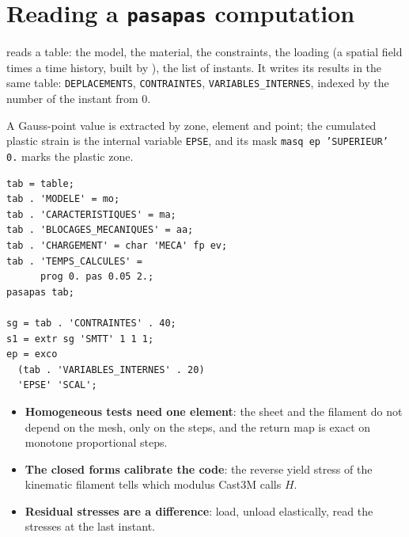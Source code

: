 \section{Reading a \texttt{pasapas} computation}\label{cc:sec4-pasapas}
%
\begin{castemcom}
 reads a table: the model, the material, the constraints, the
loading (a spatial field times a time history, built by ), the list
of instants. It writes its results in the same table: \texttt{DEPLACEMENTS},
\texttt{CONTRAINTES}, \texttt{VARIABLES\_INTERNES}, indexed by the number of
the instant from 0.

A Gauss-point value is extracted by zone, element and point; the cumulated
plastic strain is the internal variable \texttt{EPSE}, and its mask
\texttt{masq ep 'SUPERIEUR' 0.} marks the plastic zone.
\end{castemcom}
\begin{castemlines}
\begin{verbatim}
tab = table;
tab . 'MODELE' = mo;
tab . 'CARACTERISTIQUES' = ma;
tab . 'BLOCAGES_MECANIQUES' = aa;
tab . 'CHARGEMENT' = char 'MECA' fp ev;
tab . 'TEMPS_CALCULES' =
      prog 0. pas 0.05 2.;
pasapas tab;

sg = tab . 'CONTRAINTES' . 40;
s1 = extr sg 'SMTT' 1 1 1;
ep = exco
  (tab . 'VARIABLES_INTERNES' . 20)
  'EPSE' 'SCAL';
\end{verbatim}
\end{castemlines}


\begin{gbox*}
\begin{itemize}
\item \textbf{Homogeneous tests need one element}: the sheet and the
  filament do not depend on the mesh, only on the steps, and the return map is
  exact on monotone proportional steps.
\item \textbf{The closed forms calibrate the code}: the reverse yield stress
  of the kinematic filament tells which modulus Cast3M calls $H$.
\item \textbf{Residual stresses are a difference}: load, unload elastically,
  read the stresses at the last instant.
\end{itemize}
\end{gbox*}


